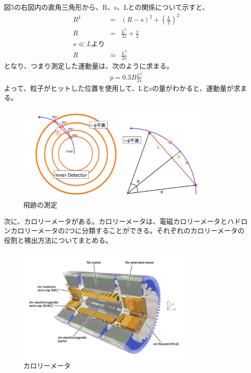 \documentclass{jreport}
\begin{document}
図5の右図内の直角三角形から、R、s、Lとの関係について示すと、
\begin{eqnarray}
	R^2 &=& (R-s)^2 + (\frac{L}{2})^2 \nonumber \\
	R &=& \frac{L^2}{2s}+\frac{s}{2} \nonumber \\
	s \ll L より && \nonumber \\
	R &\simeq& \frac{L^2}{2s}
\end{eqnarray}
となり、つまり測定した運動量は、次のように求まる。
\begin{eqnarray}
	p = 0.3 B \frac{L^2}{2s}
\end{eqnarray}
よって、粒子がヒットした位置を使用して、Lとsの量がわかると、運動量が求まる。

\begin{figure}[htbp]
	\begin{center}
	\includegraphics[width=100mm]{sagitta.png}
	\end{center}
	\caption{飛跡の測定}
	\label{fig:five}
\end{figure}
次に、カロリーメータがある。カロリーメータは、電磁カロリーメータとハドロンカロリーメータの2つに分類することができる。それぞれのカロリーメータの役割と検出方法についてまとめる。\\
\begin{figure}[htbp]
	\begin{center}
	\includegraphics[width=90mm]{calorimeter.png}
	\end{center}
	\caption{カロリーメータ}
	\label{fig:five}
\end{figure}
\end{document}

